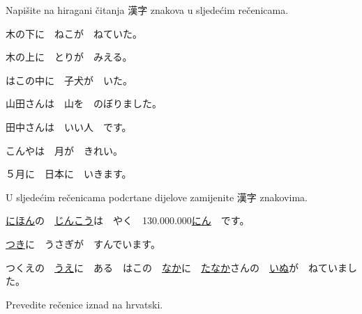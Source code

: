 
\author{Tomislav Mamić}


	
	\begin{mondai}{Napišite na hiragani čitanja 漢字 znakova u sljedećim rečenicama.}
		\item 木の下に　ねこが　ねていた。
		\item 木の上に　とりが　みえる。
		\item はこの中に　子犬が　いた。
		\item 山田さんは　山を　のぼりました。
		\item 田中さんは　いい人　です。
		\item こんやは　月が　きれい。
		\item ５月に　日本に　いきます。
	\end{mondai}

	\begin{mondai}{U sljedećim rečenicama podcrtane dijelove zamijenite 漢字 znakovima.}
		\item \underline{にほん}の　\underline{じんこう}は　やく　130.000.000\underline{にん}　です。
		\item \underline{つき}に　うさぎが　すんでいます。
		\item つくえの　\underline{うえ}に　ある　はこの　\underline{なか}に　\underline{たなか}さんの　\underline{いぬ}が　ねていました。
	\end{mondai}

	Prevedite rečenice iznad na hrvatski.
